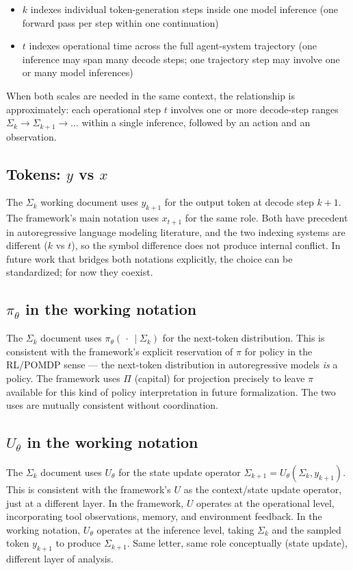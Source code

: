 \documentclass[11pt]{article}
\begin{document}
\begin{itemize}
\item $k$ indexes individual token-generation steps inside one model inference (one forward pass per step within one continuation)
\item $t$ indexes operational time across the full agent-system trajectory (one inference may span many decode steps; one trajectory step may involve one or many model inferences)
\end{itemize}

When both scales are needed in the same context, the relationship is approximately: each operational step $t$ involves one or more decode-step ranges $\Sigma_k \to \Sigma_{k+1} \to \ldots$ within a single inference, followed by an action and an observation.

\subsection*{Tokens: $y$ vs $x$}

The $\Sigma_k$ working document uses $y_{k+1}$ for the output token at decode step $k+1$. The framework's main notation uses $x_{t+1}$ for the same role. Both have precedent in autoregressive language modeling literature, and the two indexing systems are different ($k$ vs $t$), so the symbol difference does not produce internal conflict. In future work that bridges both notations explicitly, the choice can be standardized; for now they coexist.

\subsection*{$\pi_\theta$ in the working notation}

The $\Sigma_k$ document uses $\pi_\theta(\,\cdot\, \mid \Sigma_k)$ for the next-token distribution. This is consistent with the framework's explicit reservation of $\pi$ for policy in the RL/POMDP sense --- the next-token distribution in autoregressive models \emph{is} a policy. The framework uses $\Pi$ (capital) for projection precisely to leave $\pi$ available for this kind of policy interpretation in future formalization. The two uses are mutually consistent without coordination.

\subsection*{$U_\theta$ in the working notation}

The $\Sigma_k$ document uses $U_\theta$ for the state update operator $\Sigma_{k+1} = U_\theta(\Sigma_k, y_{k+1})$. This is consistent with the framework's $U$ as the context/state update operator, just at a different layer. In the framework, $U$ operates at the operational level, incorporating tool observations, memory, and environment feedback. In the working notation, $U_\theta$ operates at the inference level, taking $\Sigma_k$ and the sampled token $y_{k+1}$ to produce $\Sigma_{k+1}$. Same letter, same role conceptually (state update), different layer of analysis.
\end{document}
